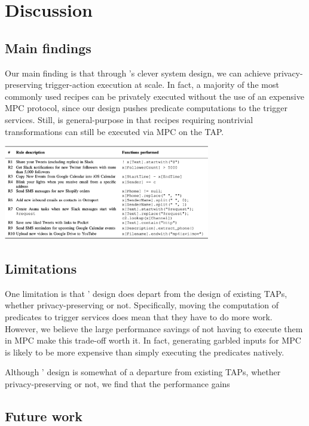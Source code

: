 \section{Discussion}
\label{sec:discussion}

\subsection{Main findings}
Our main finding is that through \sys's clever system design, we can achieve
privacy-preserving trigger-action execution at scale. In fact, a majority of the
most commonly used recipes can be privately executed without the use of an
expensive MPC protocol, since our design pushes predicate computations to the
trigger services. Still, \sys is general-purpose in that recipes requiring
nontrivial transformations can still be executed via MPC on the TAP.

\includegraphics[width=9cm]{../graphics/etap.png}

\subsection{Limitations}
One limitation is that \sys' design does depart from the design of existing
TAPs, whether privacy-preserving or not. Specifically, moving the computation of
predicates to trigger services does mean that they have to do more
work. However, we believe the large performance savings of not having to execute
them in MPC make this trade-off worth it. In fact, generating garbled inputs for
MPC is likely to be more expensive than simply executing the predicates
natively.

Although \sys' design is somewhat of a departure from existing TAPs, whether
privacy-preserving or not, we find that the performance gains

\subsection{Future work}

